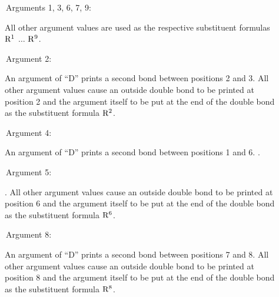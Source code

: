  \begin{description}
 \item[{\rm \ \ \ \ \ \ Arguments 1, 3, 6, 7, 9:}] \rhq
      All other argument values are used as the respective
      substituent formulas ${\rm R^1}$ $\ldots$ ${\rm R^9}$.
 \item[{\rm \ \ \ \ \ \ Argument 2:}] An argument of ``D'' prints
      a second bond between positions 2 and 3. All other 
      argument values cause an outside double bond to be
      printed at position 2 and the argument itself to be put
      at the end of the double bond as the substituent formula
      ${\rm R^2}$.
 \item[{\rm \ \ \ \ \ \ Argument 4:}] An argument of ``D'' prints
      a second bond between positions 1 and 6. \ri .
 \item[{\rm \ \ \ \ \ \ Argument 5:}] \rhq . All other argument
      values cause an outside double bond to be printed at
      position 6 and the argument itself to be put at the end
      of the double bond as the substituent formula 
      ${\rm R^6}$.
 \item[{\rm \ \ \ \ \ \ Argument 8:}] An argument of ``D'' prints
      a second bond between positions 7 and 8. All other
      argument values cause an outside double bond to be
      printed at position 8 and the argument itself to be put
      at the end of the double bond as the substituent
      formula ${\rm R^8}$.
 \end{description}




 




        
 
 





